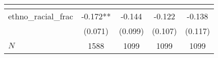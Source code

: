 {
\def\sym#1{\ifmmode^{#1}\else\(^{#1}\)\fi}
\begin{tabular}{l*{4}{c}}
\toprule
          &\multicolumn{1}{c}{}&\multicolumn{1}{c}{}&\multicolumn{1}{c}{}&\multicolumn{1}{c}{}\\
\midrule
ethno\_racial\_frac&   -0.172** &   -0.144   &   -0.122   &   -0.138   \\
          &  (0.071)   &  (0.099)   &  (0.107)   &  (0.117)   \\
\midrule
\(N\)     &     1588   &     1099   &     1099   &     1099   \\
\bottomrule
\end{tabular}
}
